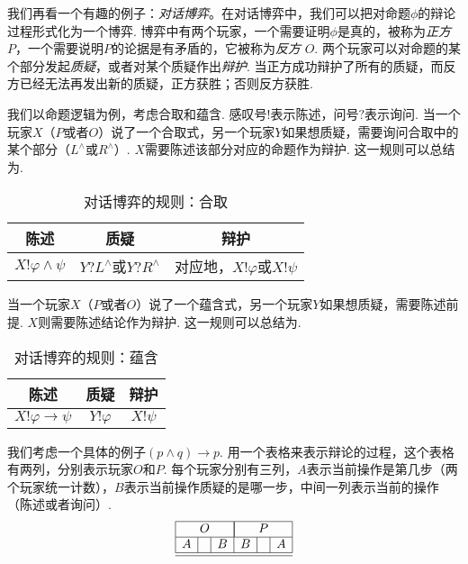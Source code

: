 我们再看一个有趣的例子：\emph{对话博弈}。在对话博弈中，我们可以把对命题$\phi$的辩论过程形式化为一个博弈. 博弈中有两个玩家，一个需要证明$\phi$是真的，被称为\emph{正方} $P$，一个需要说明$P$的论据是有矛盾的，它被称为\emph{反方} $O$. 两个玩家可以对命题的某个部分发起\emph{质疑}，或者对某个质疑作出\emph{辩护}. 当正方成功辩护了所有的质疑，而反方已经无法再发出新的质疑，正方获胜；否则反方获胜.

我们以命题逻辑为例，考虑合取和蕴含. 感叹号$!$表示陈述，问号$?$表示询问. 当一个玩家$X$（$P$或者$O$）说了一个合取式，另一个玩家$Y$如果想质疑，需要询问合取中的某个部分（$L^\wedge$或$R^\wedge$）. $X$需要陈述该部分对应的命题作为辩护. 这一规则可以总结为.
\begin{table}[ht]
    \centering
    \begin{tabular}{c|c|c}
         陈述&质疑&辩护  \\\hline
         $X!\varphi\wedge\psi$&$Y?L^\wedge$或$Y?R^\wedge$& 对应地，$X!\varphi$或$X!\psi$
    \end{tabular}
    \caption{对话博弈的规则：合取}
    \label{tab:dialogue-game-or}
\end{table}

当一个玩家$X$（$P$或者$O$）说了一个蕴含式，另一个玩家$Y$如果想质疑，需要陈述前提. $X$则需要陈述结论作为辩护. 这一规则可以总结为.
\begin{table}[ht]
    \centering
    \begin{tabular}{c|c|c}
         陈述&质疑&辩护  \\\hline
         $X!\varphi\to\psi$&$Y!\varphi$&$X!\psi$
    \end{tabular}
    \caption{对话博弈的规则：蕴含}
    \label{tab:dialogue-game-impl}
\end{table}

我们考虑一个具体的例子$(p\wedge q)\to p$. 用一个表格来表示辩论的过程，这个表格有两列，分别表示玩家$O$和$P$. 每个玩家分别有三列，$A$表示当前操作是第几步（两个玩家统一计数），$B$表示当前操作质疑的是哪一步，中间一列表示当前的操作（陈述或者询问）.
\[
    \begin{array}{|c|c|c|c|c|c|}
    \hline
        \multicolumn{3}{|c|}{O} & \multicolumn{3}{|c|}{P} \\\hline
        A &  & B & B & & A\\\hline\hline
    \end{array}
\]

